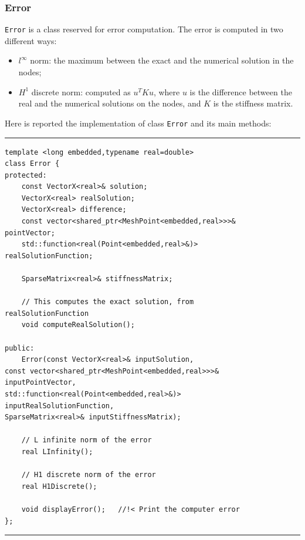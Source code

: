 \subsubsection{Error}
\verb|Error| is a class reserved for error computation. The error is computed in two different ways:
\begin{itemize}
\item $l^\infty$ norm: the maximum between the exact and the numerical solution in the nodes;
\item $H^1$ discrete norm: computed as $u^TKu$, where $u$ is the difference between the real and the numerical solutions on the nodes, and $K$ is the stiffness matrix. 
\end{itemize}

Here is reported the implementation of class \verb|Error| and its main methods:

\noindent\rule{12.7cm}{1pt}
\begin{verbatim}
template <long embedded,typename real=double>
class Error {
protected:
    const VectorX<real>& solution;
    VectorX<real> realSolution;
    VectorX<real> difference;
    const vector<shared_ptr<MeshPoint<embedded,real>>>& 
pointVector;
    std::function<real(Point<embedded,real>&)> 
realSolutionFunction;
	
    SparseMatrix<real>& stiffnessMatrix;
	
    // This computes the exact solution, from 
realSolutionFunction
    void computeRealSolution(); 
	
public:
    Error(const VectorX<real>& inputSolution,
const vector<shared_ptr<MeshPoint<embedded,real>>>& 
inputPointVector,
std::function<real(Point<embedded,real>&)> 
inputRealSolutionFunction,
SparseMatrix<real>& inputStiffnessMatrix);

    // L infinite norm of the error
    real LInfinity();
	
    // H1 discrete norm of the error
    real H1Discrete();
	
    void displayError();   //!< Print the computer error	
};
\end{verbatim}
\noindent\rule{12.7cm}{1pt}\\

